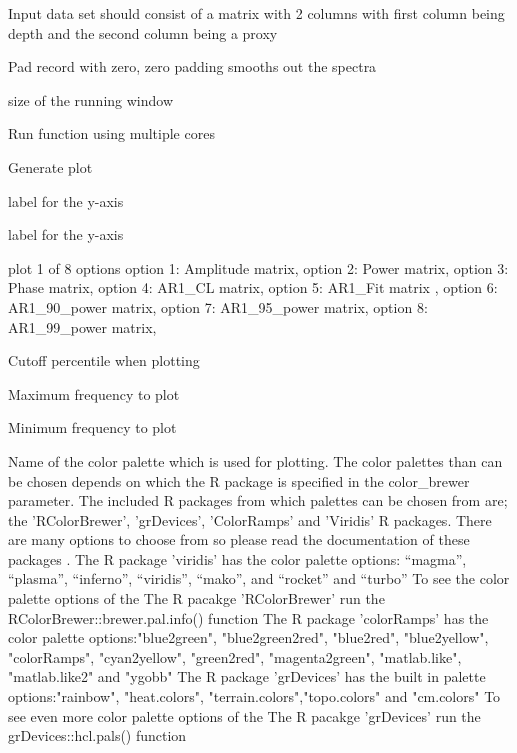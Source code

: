 \documentclass[a4paper]{book}
\begin{document}
\begin{Arguments}
\begin{ldescription}
\item[\code{data}] Input data set  should consist of a matrix with 2 columns with first column being depth and the second column being a proxy

\item[\code{padfac}] Pad record with zero, zero padding smooths out the spectra

\item[\code{window\_size}] size of the running window

\item[\code{run\_multicore}] Run function using multiple cores 

\item[\code{genplot}] Generate plot 

\item[\code{x\_lab}] label for the y-axis 

\item[\code{y\_lab}] label for the y-axis 

\item[\code{plot\_res}] plot 1 of 8 options option 1: Amplitude matrix,
option 2: Power matrix,
option 3: Phase matrix,
option 4: AR1\_CL matrix,
option 5: AR1\_Fit matrix ,
option 6: AR1\_90\_power matrix,
option 7: AR1\_95\_power matrix,
option 8: AR1\_99\_power matrix, 

\item[\code{perc\_vis}] Cutoff percentile when plotting 

\item[\code{freq\_max}] Maximum frequency to plot

\item[\code{freq\_min}] Minimum frequency to plot

\item[\code{palette\_name}] Name of the color palette which is used for plotting.
The color palettes than can be chosen depends on which the R package is specified in
the color\_brewer parameter. The included R packages from which palettes can be chosen
from are; the 'RColorBrewer', 'grDevices', 'ColorRamps' and 'Viridis' R packages.
There are many options to choose from so please
read the documentation of these packages .
The R package 'viridis' has the color palette options: “magma”, “plasma”,
“inferno”, “viridis”, “mako”, and “rocket”  and “turbo”
To see the color palette options of the The R pacakge 'RColorBrewer' run
the RColorBrewer::brewer.pal.info() function
The R package 'colorRamps' has the color palette options:"blue2green",
"blue2green2red", "blue2red",    "blue2yellow", "colorRamps",    "cyan2yellow",
"green2red", "magenta2green", "matlab.like", "matlab.like2" and    "ygobb"
The R package 'grDevices' has the built in  palette options:"rainbow",
"heat.colors", "terrain.colors","topo.colors" and "cm.colors"
To see even more color palette options of the The R pacakge 'grDevices' run
the grDevices::hcl.pals() function


\end{ldescription}
\end{Arguments}
\end{document}
